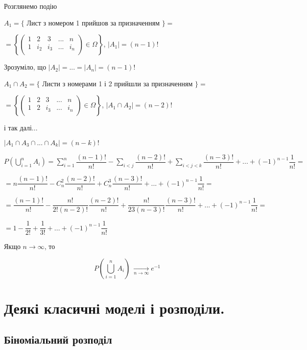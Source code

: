 Розглянемо подію 

$A_1 = \{$ Лист з номером 1 прийшов за призначенням $\} =$

$= \left\{\begin{pmatrix}
    1 & 2 & 3 & ... & n\\
    1 & i_2 & i_3 & ... & i_n \\
\end{pmatrix} \in \Omega \right\}$, $|A_1| = (n-1)!$

Зрозуміло, що $|A_2| = ... = |A_n| = (n-1)!$

$A_1 \cap A_2 = \{$ Листи з номерами 1 і 2 прийшли за призначенням $\} =$

$= \left\{\begin{pmatrix}
    1 & 2 & 3 & ... & n\\
    1 & 2 & i_3 & ... & i_n \\
\end{pmatrix} \in \Omega \right\}$, $|A_1 \cap A_2| = (n-2)!$

і так далі...

$|A_1 \cap A_3 \cap ... \cap A_k| = (n-k)!$

$P\left(\bigcup\limits_{i=1}^n A_i\right)
= \sum\limits_{i=1}^n \dfrac{(n-1)!}{n!}
    - \sum\limits_{i<j} \dfrac{(n-2)!}{n!}
    + \sum\limits_{i<j<k} \dfrac{(n-3)!}{n!}
    + ...
    + (-1)^{n-1} \dfrac{1}{n!} =$

$= n \dfrac{(n-1)!}{n!}
    - C_n^2 \dfrac{(n-2)!}{n!}
    + C_n^3 \dfrac{(n-3)!}{n!}
    + ... 
    + (-1)^{n-1} \dfrac{1}{n!} =$

$= \dfrac{(n-1)!}{n!}
    - \dfrac{n!}{2!(n-2)!} \dfrac{(n-2)!}{n!}
    + \dfrac{n!}{23(n-3)!} \dfrac{(n-3)!}{n!}
    + ... 
    + (-1)^{n-1} \dfrac{1}{n!} =$

$= 1
    - \dfrac{1}{2!}
    + \dfrac{1}{3!}
    + ... 
    + (-1)^{n-1} \dfrac{1}{n!}$

Якщо $n \rightarrow \infty$, то
 
$$P\left(\bigcup\limits_{i=1}^n A_i\right) \ \xrightarrow[n \rightarrow \infty]{} e ^{-1}$$

\chapter{Деякі класичні моделі і розподіли.}

\section{Біноміальний розподіл}


